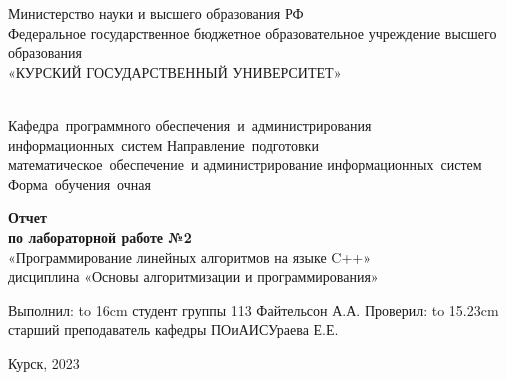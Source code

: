 \documentclass[a4paper,14pt]{extreport} %
\begin{document}
	\begin{titlepage}
		
		\begin{center}
			\vfill
			
			Министерство науки и высшего образования РФ\\
			Федеральное государственное бюджетное образовательное учреждение
			высшего образования\\
			«КУРСКИЙ ГОСУДАРСТВЕННЫЙ УНИВЕРСИТЕТ»\\
			\ \\
			\vspace{1em}
	
			\hfill\vbox
			{
				\hbox{\hspace{1cm}Кафедра программного}
				\hbox{обеспечения и администрирования}
				\hbox{информационных систем}
				\hbox{\hspace{1cm}Направление подготовки}
				\hbox{математическое обеспечение и}
				\hbox{администрирование}
				\hbox{информационных систем}
				\hbox{\hspace{1cm}Форма обучения очная}
			}
			
			\vfill
			
			{\bf Отчет\\
				по лабораторной работе №2\\}
			«Программирование линейных алгоритмов на языке C++»\\
			дисциплина «Основы алгоритмизации и программирования»\\
			
			\vfill
			
			{
				
				\hbox{Выполнил:}
				\hbox to 16cm {студент группы 113 \hfill Файтельсон А.А.}
				\hbox{}
				\hbox{Проверил:}
				\hbox to 15.23cm {старший преподаватель кафедры ПОиАИС\hfill Ураева Е.Е.}%
			}
			
			\vfill
			
			Курск, 2023
		\end{center}
		
	\end{titlepage}
	
\end{document}
